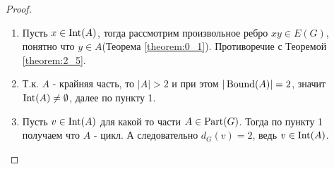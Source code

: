 \begin{proof}
	\begin{enumerate}
		\item Пусть $x \in \operatorname{Int}(A)$, тогда рассмотрим произвольное ребро  $xy \in E(G)$, понятно что  $y \in A$(Теорема \ref{theorem:0_1}).
			Противоречие с Теоремой \ref{theorem:2_5}.
		\item Т.к. $A$ - крайняя часть, то $|A| > 2$ и при этом  $|\operatorname{Bound}(A)| = 2$, значит $\operatorname{Int}(A) \neq \emptyset$, далее по пункту 1.
		\item  Пусть $v \in \operatorname{Int}(A)$ для какой то части $A \in \operatorname{Part}(G)$.
			Тогда по пункту 1 получаем что $A$ - цикл.
			А следовательно  $d_G(v) = 2$, ведь $v \in \operatorname{Int}(A)$.
	\end{enumerate}
\end{proof}


